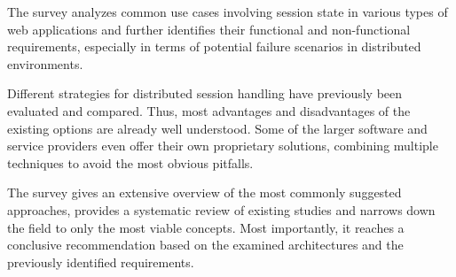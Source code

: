 The survey analyzes common use cases involving session state in various types of web applications and further identifies their functional and non-functional requirements, especially in terms of potential failure scenarios in distributed environments.

Different strategies for distributed session handling have previously been evaluated and compared. Thus, most advantages and disadvantages of the existing options are already well understood. Some of the larger software and service providers even offer their own proprietary solutions, combining multiple techniques to avoid the most obvious pitfalls.

The survey gives an extensive overview of the most commonly suggested approaches, provides a systematic review of existing studies and narrows down the field to only the most viable concepts. Most importantly, it reaches a conclusive recommendation based on the examined architectures and the previously identified requirements.
